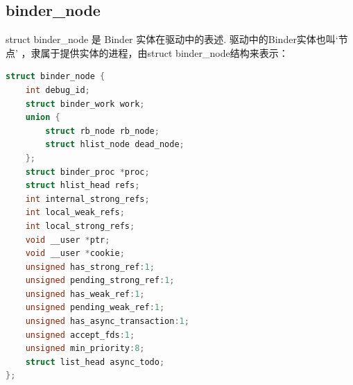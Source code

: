 \documentclass[a4paper,11pt]{article}
\begin{document}

\subsection{binder_node}
struct binder_node 是 Binder 实体在驱动中的表述. 驱动中的Binder实体也叫‘节点’
，隶属于提供实体的进程，由struct binder_node结构来表示：
\begin{lstlisting}[language=C,multicols=2,label=BinderNode]
struct binder_node {
    int debug_id;
    struct binder_work work;
    union {
        struct rb_node rb_node;
        struct hlist_node dead_node;
    };
    struct binder_proc *proc;
    struct hlist_head refs;
    int internal_strong_refs;
    int local_weak_refs;
    int local_strong_refs;
    void __user *ptr;
    void __user *cookie;
    unsigned has_strong_ref:1;
    unsigned pending_strong_ref:1;
    unsigned has_weak_ref:1;
    unsigned pending_weak_ref:1;
    unsigned has_async_transaction:1;
    unsigned accept_fds:1;
    unsigned min_priority:8;
    struct list_head async_todo;
};
\end{lstlisting}
\end{document}
